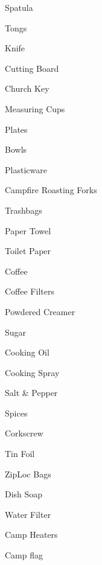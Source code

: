 \documentclass{article}
\begin{document}
{\begin{multicols*}{3}
      \begin{packlist}
        \item Spatula
        \item Tongs
        \item Knife
        \item Cutting Board
        \item Church Key
        \item Measuring Cups
        \item Plates
        \item Bowls
        \item Plasticware
        \item Campfire Roasting Forks
      \end{packlist}


      \begin{packlist}
        \item Trashbags
        \item Paper Towel
        \item Toilet Paper
      \end{packlist}

      \begin{packlist}
        \item Coffee
        \item Coffee Filters
        \item Powdered Creamer
        \item Sugar
        \item Cooking Oil
        \item Cooking Spray
        \item Salt \& Pepper
        \item Spices
        \item Corkscrew
        \item Tin Foil
        \item ZipLoc Bags
        \item Dish Soap
      \end{packlist}


      \begin{packlist}
        \item Water Filter
        \item Camp Heaters
        \item Camp flag
      \end{packlist}
    \end{multicols*}
  }
\end{document}

